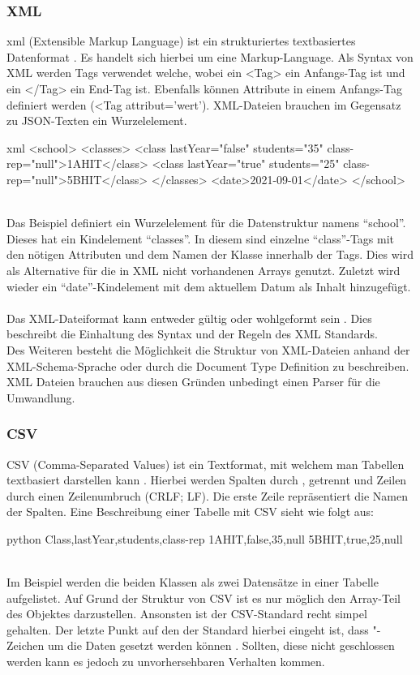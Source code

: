 		\subsubsection{XML}
		\Gls{xml} (Extensible Markup Language) ist ein strukturiertes textbasiertes Datenformat \cite{xmlStandard}. Es handelt sich hierbei um eine Markup-Language. Als Syntax von XML werden Tags verwendet welche, wobei ein <Tag> ein Anfangs-Tag ist und ein </Tag> ein End-Tag ist. Ebenfalls können Attribute in einem Anfangs-Tag definiert werden (<Tag attribut='wert'). XML-Dateien brauchen im Gegensatz zu JSON-Texten ein Wurzelelement.
		\begin{code}{xml}
		<school>
			<classes>
				<class lastYear="false" students="35" class-rep="null">1AHIT</class>
				<class lastYear="true" students="25" class-rep="null">5BHIT</class>
			</classes>
			<date>2021-09-01</date>
		</school>
		\end{code}
		\label{code:xml}~\\
		Das Beispiel definiert ein Wurzelelement für die Datenstruktur namens \enquote{school}. Dieses hat ein Kindelement \enquote{classes}. In diesem sind einzelne \enquote{class}-Tags mit den nötigen Attributen und dem Namen der Klasse innerhalb der Tags. Dies wird als Alternative für die in XML nicht vorhandenen Arrays genutzt. Zuletzt wird wieder ein \enquote{date}-Kindelement mit dem aktuellem Datum als Inhalt hinzugefügt.\\~\\
		Das XML-Dateiformat kann entweder gültig oder wohlgeformt sein \cite{xmlStandard}. Dies beschreibt die Einhaltung des Syntax und der Regeln des XML Standards.\\
		Des Weiteren besteht die Möglichkeit die Struktur von XML-Dateien anhand der XML-Schema-Sprache oder durch die Document Type Definition zu beschreiben. XML Dateien brauchen aus diesen Gründen unbedingt einen Parser für die Umwandlung.
		
		\newpage
		
		\subsubsection{CSV}
		CSV (Comma-Separated Values) ist ein Textformat, mit welchem man Tabellen textbasiert darstellen kann \cite{rfc4180}. Hierbei werden Spalten durch , getrennt und Zeilen durch einen Zeilenumbruch (CRLF; LF). Die erste Zeile repräsentiert die Namen der Spalten. Eine Beschreibung einer Tabelle mit CSV sieht wie folgt aus:
		\begin{code}{python}
			Class,lastYear,students,class-rep
			1AHIT,false,35,null
			5BHIT,true,25,null
		\end{code}
		\label{code:csv}~\\
		Im Beispiel werden die beiden Klassen als zwei Datensätze in einer Tabelle aufgelistet. Auf Grund der Struktur von CSV ist es nur möglich den Array-Teil des Objektes darzustellen. Ansonsten ist der CSV-Standard recht simpel gehalten. Der letzte Punkt auf den der Standard hierbei eingeht ist, dass "-Zeichen um die Daten gesetzt werden können \cite{rfc4180}. Sollten, diese nicht geschlossen werden kann es jedoch zu unvorhersehbaren Verhalten kommen.
